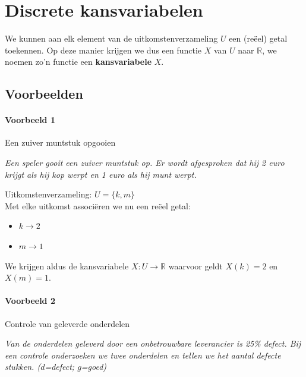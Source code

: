 \documentclass[a4paper,12pt, twoside]{article}
\begin{document}
\thispagestyle{empty}
\newpage

\begin{singlespacing}
  \small
  \tableofcontents
\end{singlespacing}
\thispagestyle{empty}
\newpage


\pagestyle{fancy}
\fancyhead[RE,LO]{}

\cleardoublepage
\section{Discrete kansvariabelen}

We kunnen aan elk element van de uitkomstenverzameling $U$ een (reëel) getal toekennen. Op deze manier krijgen we dus een functie $X$ van $U$ naar $\mathbb{R}$, we noemen zo'n functie een {\bf kansvariabele} $X$.

\subsection{Voorbeelden}

\paragraph*{Voorbeeld 1} Een zuiver muntstuk opgooien

{\em Een speler gooit een zuiver muntstuk op. Er wordt afgesproken dat hij 2 euro krijgt als hij kop werpt en 1 euro als hij munt werpt.}

Uitkomstenverzameling: $U=\{k, m\}$\\
Met elke uitkomst associëren we nu een reëel getal:
\begin{itemize}
  \item $k \to 2$
  \item $m \to 1$
\end{itemize}
We krijgen aldus de kansvariabele $X:U\to\mathbb{R}$ waarvoor geldt $X(k)=2$ en $X(m)=1$.

\paragraph*{Voorbeeld 2} Controle van geleverde onderdelen

{\em Van de onderdelen geleverd door een onbetrouwbare leverancier is 25\% defect. Bij een controle onderzoeken we twee onderdelen en tellen we het aantal defecte stukken. ($d$=defect; $g$=goed)}
\end{document}
